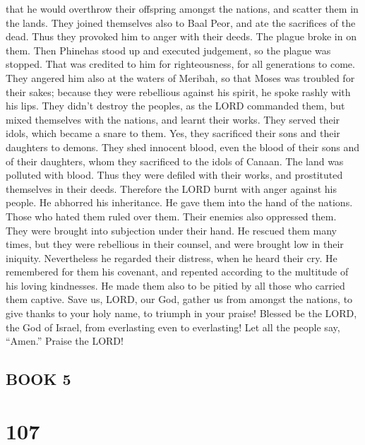 that he would overthrow their offspring amongst the nations, and scatter
them in the lands.  They joined themselves also to Baal
Peor, and ate the sacrifices of the dead.  Thus they
provoked him to anger with their deeds. The plague broke in on them.
 Then Phinehas stood up and executed judgement, so the
plague was stopped.  That was credited to him for
righteousness, for all generations to come.  They angered
him also at the waters of Meribah, so that Moses was troubled for their
sakes;  because they were rebellious against his spirit,
he spoke rashly with his lips.  They didn't destroy the
peoples, as the LORD commanded them,  but mixed
themselves with the nations, and learnt their works. 
They served their idols, which became a snare to them. 
Yes, they sacrificed their sons and their daughters to demons.
 They shed innocent blood, even the blood of their sons
and of their daughters, whom they sacrificed to the idols of Canaan. The
land was polluted with blood.  Thus they were defiled
with their works, and prostituted themselves in their deeds.
 Therefore the LORD burnt with anger against his people.
He abhorred his inheritance.  He gave them into the hand
of the nations. Those who hated them ruled over them. 
Their enemies also oppressed them. They were brought into subjection
under their hand.  He rescued them many times, but they
were rebellious in their counsel, and were brought low in their
iniquity.  Nevertheless he regarded their distress, when
he heard their cry.  He remembered for them his covenant,
and repented according to the multitude of his loving kindnesses.
 He made them also to be pitied by all those who carried
them captive.  Save us, LORD, our God, gather us from
amongst the nations, to give thanks to your holy name, to triumph in
your praise!  Blessed be the LORD, the God of Israel,
from everlasting even to everlasting! Let all the people say, ``Amen.''
Praise the LORD!

\hypertarget{book-5}{%
\subsection{BOOK 5}\label{book-5}}

\hypertarget{section-99}{%
\section{107}\label{section-99}}

